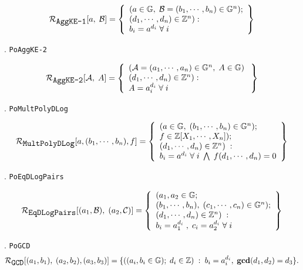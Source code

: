 \documentclass[11pt, lettersize, notitlepage, leqno, footskip=0.6cm]{article}
\newcommand{\bz}{\mathbb Z}
\newcommand{\mc}{\mathcal}
\newcommand{\mb}{\mathbb}
\newcommand{\mbf}{\mathbf}
\newcommand{\noin}{\noindent}
\newcommand{\GCD}{\mbf{gcd}}
\numberwithin{equation}{section}
\begin{document}
{\[
  \mc{R}_{{\protect\verb|AggKE-1|}}[a,\; \mc{B}] = \left\{\begin{array}{l}
    (a\in\mb{G},\; \mc{B} = (b_1,\cdots, b_n)\in\mb{G}^n);\\ 
    (d_1,\cdots,d_n)\in\bz^n):  \\
    b_i = a^{d_i}\;\forall\; i
  \end{array}\right\}
\]

\noin 5. \verb|PoAggKE-2| \vspace{-0.3cm}

\[
  \mc{R}_{{\protect\verb|AggKE-2|}}[\mc{A},\;A] = \left\{\begin{array}{l}
    (\mc{A} = (a_1,\cdots, a_n)\in \mb{G}^n,\; A\in\mb{G})\;\\ 
    (d_1,\cdots,d_n)\in\bz^n) :  \\
     A = a_i^{d_i}\;\forall\; i
  \end{array}\right\}
\]

\noin 6. \verb|PoMultPolyDLog| \vspace{-0.3cm}

\[
  \mc{R}_{{\protect\verb|MultPolyDLog|}}[a, (b_1,\cdots, b_n), f] = \left\{\begin{array}{l}
    (a\in\mb{G},\; (b_1,\cdots, b_n)\in\mb{G}^n);\\
    f\in\bz[X_1,\cdots,X_n]);\\ 
    (d_1,\cdots,d_n)\in \bz^n)\;: \\
    b_i = a^{d_i}\;\forall\; i\;\bigwedge \;   f(d_1,\cdots,d_n) = 0 
  \end{array}\right\}
\]

\noin 7. \verb|PoEqDLogPairs| \vspace{-0.3cm}

\[
  \mc{R}_{{\protect\verb|EqDLogPairs|}}[(a_1, \mc{B}),\; (a_2, \mc{C})] = \left\{\begin{array}{l}
  	(a_1,a_2\in\mb{G};\\
    (b_1,\cdots, b_n),\;(c_1,\cdots, c_n)\in\mb{G}^n);\\
    (d_1,\cdots,d_n)\in \bz^n)\;: \\
    b_i = a_1^{d_i}\;,\;c_i= a_2^{d_i} \;\forall\; i
  \end{array}\right\}
\]

\noin 8. \verb|PoGCD| \vspace{-0.2cm}
$$\mc{R}_{{\protect\verb|GCD|}}[(a_1,b_1),\; (a_2,b_2),(a_3,b_3)] = \{((a_i, b_i\in\mb{G});\;d_i\in\bz)\;:\; b_i = a_i^{d_i},\;\GCD(d_1,d_2)=d_3  \} .$$


}
\end{document}
